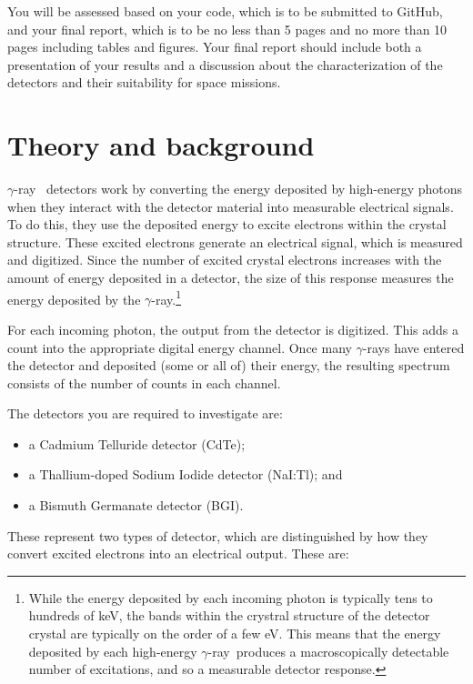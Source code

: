 \documentclass{tufte-book}
\newcommand{\gmray}{$\gamma$-ray}
\begin{document}
You will be assessed based on your code, which is to be submitted to GitHub, and your final report, which is to be no less than 5 pages and no more than 10 pages including tables and figures. Your final report should include both a presentation of your results and a discussion about the characterization of the detectors and their suitability for space missions.

\section{Theory and background}

\gmray~ detectors work by converting the energy deposited by high-energy photons when they interact with the detector material into measurable electrical signals. To do this, they use the deposited energy to excite electrons within the crystal structure. These excited electrons generate an electrical signal, which is measured and digitized. Since the number of excited crystal electrons increases with the amount of energy deposited in a detector, the size of this response measures the energy deposited by the \gmray.\footnote{While the energy deposited by each incoming photon is typically tens to hundreds of keV, the bands within the crystral structure of the detector crystal are typically on the order of a few eV. This means that the energy deposited by each high-energy \gmray\, produces a macroscopically detectable number of excitations, and so a measurable detector response.}

For each incoming photon, the output from the detector is digitized. This adds a count into the appropriate digital energy channel. Once many \gmray s have entered the detector and deposited (some or all of) their energy, the resulting spectrum consists of the number of counts in each channel.

The detectors you are required to investigate are:

\begin{itemize}
    \item 
        a Cadmium Telluride detector (CdTe);
    \item  
        a Thallium-doped Sodium Iodide detector (NaI:Tl); and
    \item 
        a Bismuth Germanate detector (BGI).
\end{itemize}

These represent two types of detector, which are distinguished by how they convert excited electrons into an electrical output. These are:
\end{document}
